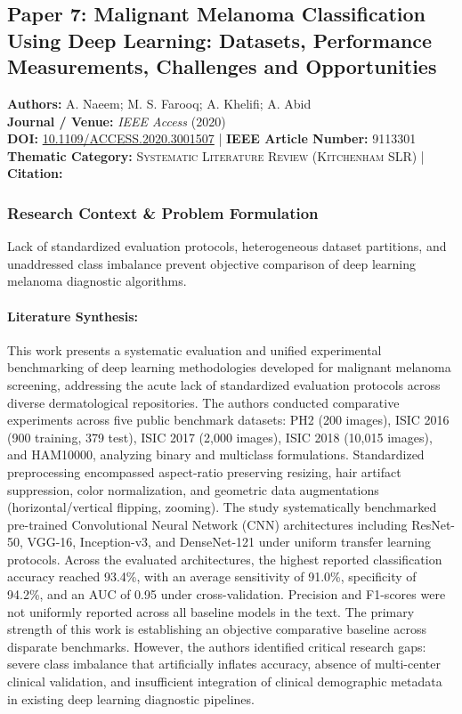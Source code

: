 \subsection{Paper 7: Malignant Melanoma Classification Using Deep Learning: Datasets, Performance Measurements, Challenges and Opportunities}
\label{sec:paper_7}

\begin{tcolorbox}[colback=gray!5!white,colframe=gray!75!black,title=\textbf{Metadata \& Citation Summary}]
\textbf{Authors:} A. Naeem; M. S. Farooq; A. Khelifi; A. Abid \\
\textbf{Journal / Venue:} \textit{IEEE Access} (2020) \\
\textbf{DOI:} \href{https://doi.org/10.1109/ACCESS.2020.3001507}{10.1109/ACCESS.2020.3001507} \quad | \quad \textbf{IEEE Article Number:} 9113301 \\
\textbf{Thematic Category:} \textsc{Systematic Literature Review (Kitchenham SLR)} \quad | \quad \textbf{Citation:} \cite{9113301}
\end{tcolorbox}

\subsubsection*{Research Context \& Problem Formulation}
Lack of standardized evaluation protocols, heterogeneous dataset partitions, and unaddressed class imbalance prevent objective comparison of deep learning melanoma diagnostic algorithms.

\paragraph{Literature Synthesis:} This work presents a systematic evaluation and unified experimental benchmarking of deep learning methodologies developed for malignant melanoma screening, addressing the acute lack of standardized evaluation protocols across diverse dermatological repositories. The authors conducted comparative experiments across five public benchmark datasets: PH2 (200 images), ISIC 2016 (900 training, 379 test), ISIC 2017 (2,000 images), ISIC 2018 (10,015 images), and HAM10000, analyzing binary and multiclass formulations. Standardized preprocessing encompassed aspect-ratio preserving resizing, hair artifact suppression, color normalization, and geometric data augmentations (horizontal/vertical flipping, zooming). The study systematically benchmarked pre-trained Convolutional Neural Network (CNN) architectures including ResNet-50, VGG-16, Inception-v3, and DenseNet-121 under uniform transfer learning protocols. Across the evaluated architectures, the highest reported classification accuracy reached 93.4\%, with an average sensitivity of 91.0\%, specificity of 94.2\%, and an AUC of 0.95 under cross-validation. Precision and F1-scores were not uniformly reported across all baseline models in the text. The primary strength of this work is establishing an objective comparative baseline across disparate benchmarks. However, the authors identified critical research gaps: severe class imbalance that artificially inflates accuracy, absence of multi-center clinical validation, and insufficient integration of clinical demographic metadata in existing deep learning diagnostic pipelines.

